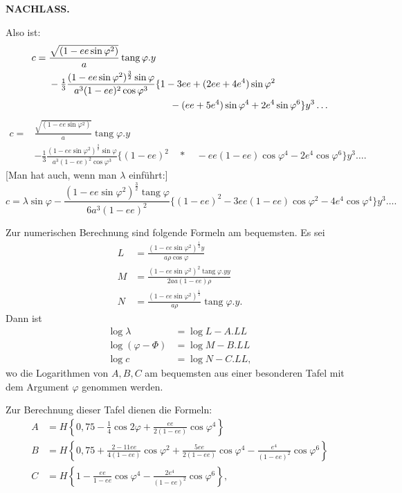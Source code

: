 \par\clearpage
{}\hfill{\small\textbf{NACHLASS.}}\hfill\null\par\medskip
Also ist:
\[
\begin{aligned}
c={}&\frac{\sqrt{(1-ee\sin\varphi^2)}}a\operatorname{tang}\varphi.y\\
&-\tfrac13\frac{(1-ee\sin\varphi^2)^{\frac32}\sin\varphi}{a^3(1-ee)^2\cos\varphi^3}\{1-3ee+(2ee+4e^4)\sin\varphi^2\\
&\hspace{44mm}-(ee+5e^4)\sin\varphi^4+2e^4\sin\varphi^6\}y^3\ldots
\end{aligned}
\]
\noindent[oder]
\[
\begin{aligned}
c={}&\frac{\sqrt{(1-ee\sin\varphi^2)}}a\operatorname{tang}\varphi.y\\
&-\tfrac13\frac{(1-ee\sin\varphi^2)^{\frac32}\sin\varphi}{a^3(1-ee)^2\cos\varphi^3}\{(1-ee)^2\quad *\quad-ee(1-ee)\cos\varphi^4-2e^4\cos\varphi^6\}y^3\ldots.
\end{aligned}
\]
[Man hat auch, wenn man \(\lambda\) einführt:]
\[c=\lambda\sin\varphi-\frac{(1-ee\sin\varphi^2)^{\frac32}\operatorname{tang}\varphi}{6a^3(1-ee)^2}\{(1-ee)^2-3ee(1-ee)\cos\varphi^2-4e^4\cos\varphi^4\}y^3\ldots.\]
\medskip
{\centering [3.]\par}
Zur numerischen Berechnung sind folgende Formeln am bequemsten. Es sei
\[
\begin{aligned}
L&=\frac{(1-ee\sin\varphi^2)^{\frac12}y}{a\rho\cos\varphi}\\
M&=\frac{(1-ee\sin\varphi^2)^2\operatorname{tang}\varphi.yy}{2aa(1-ee)\rho}\\
N&=\frac{(1-ee\sin\varphi^2)^{\frac12}}{a\rho}\operatorname{tang}\varphi.y.
\end{aligned}
\]
Dann ist
\[
\begin{aligned}
\log\lambda&=\log L-A.LL\\
\log(\varphi-\Phi)&=\log M-B.LL\\
\log c&=\log N-C.LL,
\end{aligned}
\]
\noindent wo die Logarithmen von \(A,B,C\) am bequemsten aus einer besonderen Tafel mit dem Argument \(\varphi\) genommen werden.

Zur Berechnung dieser Tafel dienen die Formeln:
\[
\begin{aligned}
A&=H\left\{0{,}75-\tfrac14\cos2\varphi+\frac{ee}{2(1-ee)}\cos\varphi^4\right\}\\
B&=H\left\{0{,}75+\frac{2-11ee}{4(1-ee)}\cos\varphi^2+\frac{5ee}{2(1-ee)}\cos\varphi^4-\frac{e^4}{(1-ee)^2}\cos\varphi^6\right\}\\
C&=H\left\{1-\frac{ee}{1-ee}\cos\varphi^4-\frac{2e^4}{(1-ee)^2}\cos\varphi^6\right\},
\end{aligned}
\]

